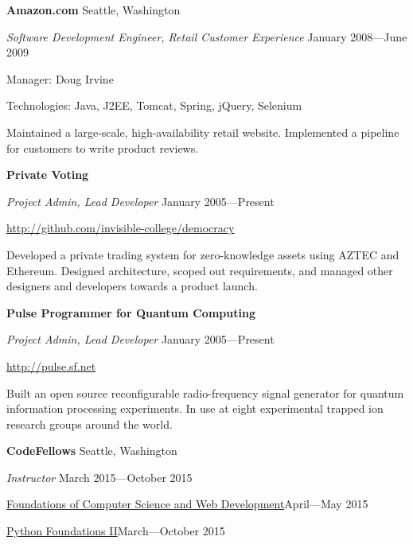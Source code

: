 \documentclass[letter]{article}
\begin{document}
\vspace{\baselineskip}
\par
{\bf {Amazon.com}} \hfill Seattle, Washington
\par
{\em Software Development Engineer, Retail Customer Experience} \hfill January 2008---June 2009
\par
Manager: Doug Irvine
\vspace{0.5\baselineskip}
\par
Technologies: Java, J2EE, Tomcat, Spring, jQuery, Selenium
\vspace{0.5\baselineskip}
\par
Maintained a large-scale, high-availability
retail website. Implemented a pipeline for customers to write product reviews.

\vspace{\baselineskip}
\par
{\bf {Private Voting}} 
\par
{\em Project Admin, Lead Developer} \hfill January 2005---Present
\par
\url{http://github.com/invisible-college/democracy}
\par
Developed a private trading system for zero-knowledge assets
using AZTEC and Ethereum. Designed architecture, scoped out
requirements, and managed other designers and developers
towards a product launch.

\vspace{\baselineskip}
\par
{\bf {Pulse Programmer for Quantum Computing}}
\par
{\em Project Admin, Lead Developer} \hfill January 2005---Present
\par
\url{http://pulse.sf.net}
\par
Built an open source reconfigurable radio-frequency signal generator
for quantum information processing experiments.
In use at eight experimental trapped ion research groups around the world.


{\bf CodeFellows} \hfill Seattle, Washington

\par
{\em Instructor} \hfill March 2015---October 2015

\vspace{0.5\baselineskip}
\par
\href{https://www.codefellows.org/courses/foundations-1/computer-science-and-web-development}{Foundations of Computer Science and Web Development}\hfill April---May 2015
\vspace{0.5\baselineskip}
\par
\href{https://www.codefellows.org/courses/foundations-2/python}{Python Foundations II}\hfill March---October 2015
\end{document}
